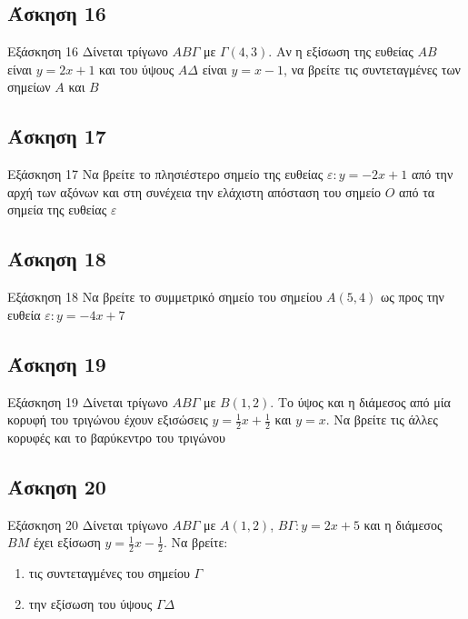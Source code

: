 \documentclass[greek]{beamer}
\begin{document}
\subsection{Άσκηση 16}
\begin{frame}[label=Άσκηση16]{Εξάσκηση 16}
 Δίνεται τρίγωνο $ΑΒΓ$ με $Γ(4,3)$. Αν η εξίσωση της ευθείας $ΑΒ$ είναι $y=2x+1$ και του ύψους $ΑΔ$ είναι $y=x-1$, να βρείτε τις συντεταγμένες των σημείων $Α$ και $Β$

\end{frame}

\subsection{Άσκηση 17}
\begin{frame}[label=Άσκηση17]{Εξάσκηση 17}
 Να βρείτε το πλησιέστερο σημείο της ευθείας $ε:y=-2x+1$ από την αρχή των αξόνων και στη συνέχεια την ελάχιστη απόσταση του σημείο $Ο$ από τα σημεία της ευθείας $ε$

\end{frame}

\subsection{Άσκηση 18}
\begin{frame}[label=Άσκηση18]{Εξάσκηση 18}
 Να βρείτε το συμμετρικό σημείο του σημείου $Α(5,4)$ ως προς την ευθεία $ε:y=-4x+7$

\end{frame}

\subsection{Άσκηση 19}
\begin{frame}[label=Άσκηση19]{Εξάσκηση 19}
 Δίνεται τρίγωνο $ΑΒΓ$ με $Β(1,2)$. Το ύψος και η διάμεσος από μία κορυφή του τριγώνου έχουν εξισώσεις $y=\frac{1}{2}x+\frac{1}{2}$ και $y=x$. Να βρείτε τις άλλες κορυφές και το βαρύκεντρο του τριγώνου

\end{frame}

\subsection{Άσκηση 20}
\begin{frame}[label=Άσκηση20 ]{Εξάσκηση 20}
 Δίνεται τρίγωνο $ΑΒΓ$ με $Α(1,2)$, $ΒΓ:y=2x+5$ και η διάμεσος $ΒΜ$ έχει εξίσωση $y=\frac{1}{2}x-\frac{1}{2}$. Να βρείτε:
 \begin{enumerate}
  \item<1-> τις συντεταγμένες του σημείου $Γ$
  \item<2-> την εξίσωση του ύψους $ΓΔ$
 \end{enumerate}

\end{frame}
\end{document}
